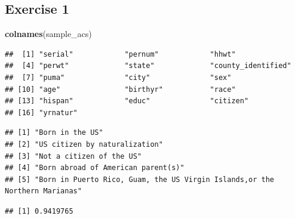 \documentclass[]{book}
\newenvironment{Shaded}{\begin{snugshade}}{\end{snugshade}}
\newcommand{\KeywordTok}[1]{\textcolor[rgb]{0.13,0.29,0.53}{\textbf{#1}}}
\newcommand{\NormalTok}[1]{#1}
\newcommand{\OperatorTok}[1]{\textcolor[rgb]{0.81,0.36,0.00}{\textbf{#1}}}
\newcommand{\StringTok}[1]{\textcolor[rgb]{0.31,0.60,0.02}{#1}}
\theoremstyle{definition}
\theoremstyle{definition}
\theoremstyle{definition}
\theoremstyle{remark}
\begin{document}
\hypertarget{exercise-1}{%
\subsection*{Exercise 1}\label{exercise-1}}

\begin{Shaded}
\begin{Highlighting}[]
\KeywordTok{colnames}\NormalTok{(sample_acs)}
\end{Highlighting}
\end{Shaded}

\begin{verbatim}
##  [1] "serial"            "pernum"            "hhwt"             
##  [4] "perwt"             "state"             "county_identified"
##  [7] "puma"              "city"              "sex"              
## [10] "age"               "birthyr"           "race"             
## [13] "hispan"            "educ"              "citizen"          
## [16] "yrnatur"
\end{verbatim}

\begin{Shaded}
\end{Shaded}

\begin{verbatim}
## [1] "Born in the US"                                                           
## [2] "US citizen by naturalization"                                             
## [3] "Not a citizen of the US"                                                  
## [4] "Born abroad of American parent(s)"                                        
## [5] "Born in Puerto Rico, Guam, the US Virgin Islands,or the Northern Marianas"
\end{verbatim}

\begin{Shaded}
\end{Shaded}

\begin{verbatim}
## [1] 0.9419765
\end{verbatim}
\end{document}
